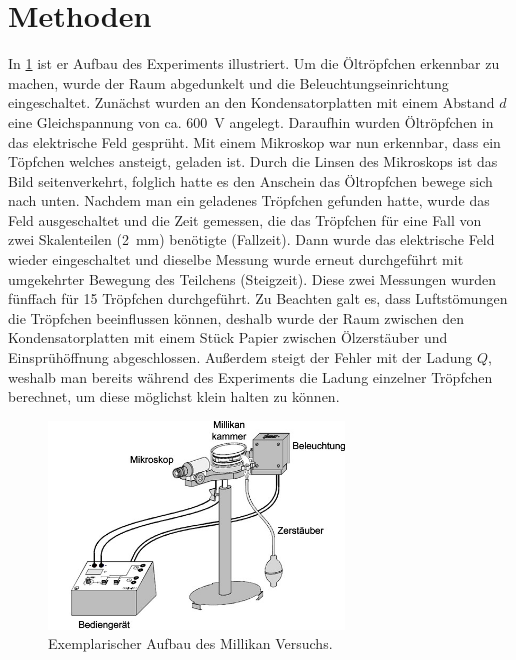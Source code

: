 \documentclass[
	a4paper,
	12pt,
	pagesize,
	ngerman
]{scrartcl}
\begin{document}
	\section{Methoden}
	In \cref{Millikan} ist er Aufbau des Experiments illustriert.
	Um die Öltröpfchen erkennbar zu machen, wurde der Raum abgedunkelt und die Beleuchtungseinrichtung eingeschaltet.
	Zunächst wurden an den Kondensatorplatten mit einem Abstand $d$ eine Gleichspannung von ca. \SI{600}{V} angelegt. 
	Daraufhin wurden Öltröpfchen in das elektrische Feld gesprüht.
	Mit einem Mikroskop war nun erkennbar, dass ein Töpfchen welches ansteigt, geladen ist. 
	Durch die Linsen des Mikroskops ist das Bild seitenverkehrt, folglich hatte es den Anschein das Öltropfchen bewege sich nach unten. 
	Nachdem man ein geladenes Tröpfchen gefunden hatte, wurde das Feld ausgeschaltet und die Zeit gemessen, die das Tröpfchen für eine Fall von zwei Skalenteilen (\SI{2}{mm}) benötigte (Fallzeit).
	Dann wurde das elektrische Feld wieder eingeschaltet und dieselbe Messung wurde erneut durchgeführt mit umgekehrter Bewegung des Teilchens (Steigzeit).
	Diese zwei Messungen wurden fünffach für 15 Tröpfchen durchgeführt. 
	Zu Beachten galt es, dass Luftstömungen die Tröpfchen beeinflussen können, deshalb wurde der Raum zwischen den Kondensatorplatten mit einem Stück Papier zwischen Ölzerstäuber und Einsprühöffnung abgeschlossen.
	Außerdem steigt der Fehler mit der Ladung $Q$, weshalb man bereits während des Experiments die Ladung einzelner Tröpfchen berechnet, um diese möglichst klein halten zu können.


	\begin{figure}[H]
		\includegraphics[width=0.7\textwidth]{Millikan}
		\centering
		\caption{Exemplarischer Aufbau des Millikan Versuchs.\cite{TUM} }
		\label{Millikan}
		\centering
	\end{figure} 
\end{document}
